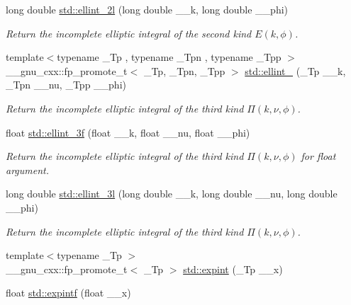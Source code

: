 \begin{DoxyCompactItemize}
long double \hyperlink{group__mathsf__std_ga5c791332d374a809d8ca16c69a1a30f5}{std\+::ellint\+\_\+2l} (long double \+\_\+\+\_\+k, long double \+\_\+\+\_\+phi)
\begin{DoxyCompactList}\small\item\em Return the incomplete elliptic integral of the second kind $ E(k,\phi) $. \end{DoxyCompactList}\item 
{\footnotesize template$<$typename \+\_\+\+Tp , typename \+\_\+\+Tpn , typename \+\_\+\+Tpp $>$ }\\\+\_\+\+\_\+gnu\+\_\+cxx\+::fp\+\_\+promote\+\_\+t$<$ \+\_\+\+Tp, \+\_\+\+Tpn, \+\_\+\+Tpp $>$ \hyperlink{group__mathsf__std_gaac0240d1e7e401e652b9d1adf4c7e029}{std\+::ellint\+\_} (\+\_\+\+Tp \+\_\+\+\_\+k, \+\_\+\+Tpn \+\_\+\+\_\+nu, \+\_\+\+Tpp \+\_\+\+\_\+phi)
\begin{DoxyCompactList}\small\item\em Return the incomplete elliptic integral of the third kind $ \Pi(k,\nu,\phi) $. \end{DoxyCompactList}\item 
float \hyperlink{group__mathsf__std_ga1a80bd2c15bc9fbecda2630a9e9409e7}{std\+::ellint\+\_\+3f} (float \+\_\+\+\_\+k, float \+\_\+\+\_\+nu, float \+\_\+\+\_\+phi)
\begin{DoxyCompactList}\small\item\em Return the incomplete elliptic integral of the third kind $ \Pi(k,\nu,\phi) $ for {\ttfamily float} argument. \end{DoxyCompactList}\item 
long double \hyperlink{group__mathsf__std_gaa8c0e5864df8769021a7f3e21a30c5d2}{std\+::ellint\+\_\+3l} (long double \+\_\+\+\_\+k, long double \+\_\+\+\_\+nu, long double \+\_\+\+\_\+phi)
\begin{DoxyCompactList}\small\item\em Return the incomplete elliptic integral of the third kind $ \Pi(k,\nu,\phi) $. \end{DoxyCompactList}\item 
{\footnotesize template$<$typename \+\_\+\+Tp $>$ }\\\+\_\+\+\_\+gnu\+\_\+cxx\+::fp\+\_\+promote\+\_\+t$<$ \+\_\+\+Tp $>$ \hyperlink{group__mathsf__std_ga0e9ac717a106ef54184b5f058c451782}{std\+::expint} (\+\_\+\+Tp \+\_\+\+\_\+x)
\item 
float \hyperlink{group__mathsf__std_ga5842816f6eed2594e0a327df4e4a2a47}{std\+::expintf} (float \+\_\+\+\_\+x)
\item 

\end{DoxyCompactItemize}
